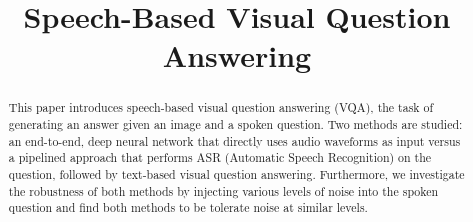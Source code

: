 \documentclass[letterpaper]{article} %
\begin{document}
\title{Speech-Based Visual Question Answering}





\maketitle
\begin{abstract}
This paper introduces speech-based visual question answering (VQA), the task of generating an answer given an image and a spoken question. Two methods are studied: an end-to-end, deep neural network that directly uses audio waveforms as input versus a pipelined approach that performs ASR (Automatic Speech Recognition) on the question, followed by text-based visual question answering. Furthermore, we investigate the robustness of both methods by injecting various levels of noise into the spoken question and find both methods to be tolerate noise at similar levels.
\end{abstract}
\end{document}
